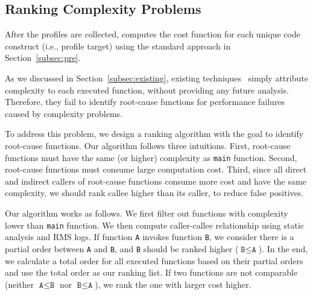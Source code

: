 \subsection{Ranking Complexity Problems}

After the profiles are collected, \Tool computes
the cost function for each unique code construct
(i.e., profile target) using the standard approach
in Section~\ref{subsec:pre}. 
 
As we discussed in Section~\ref{subsec:existing}, 
existing techniques~\cite{Aprof1,Aprof2,AlgoProf} 
simply attribute complexity to each executed function, 
without providing any future analysis. 
Therefore, they fail to identify root-cause functions for 
performance failures caused by complexity problems. 

To address this problem, we design a ranking algorithm 
with the goal to identify root-cause functions. 
Our algorithm follows three intuitions. 
First, root-cause functions must have the same (or higher) 
complexity as \texttt{main} function.
Second, root-cause functions must consume large computation cost.
Third, since all direct and indirect callers of root-cause functions 
consume more cost and have the same complexity, 
we should rank callee higher than its caller, 
to reduce false positives. 

Our algorithm works as follows. 
We first filter out functions with complexity lower than \texttt{main} function.
We then compute caller-callee relationship using static analysis and RMS logs. 
If function \texttt{A} invokes function \texttt{B}, 
we consider there is a partial order between \texttt{A} and \texttt{B},
and \texttt{B} should be ranked higher ($\texttt{B} \leq \texttt{A}$). 
In the end, we calculate a total order for all executed functions based 
on their partial orders and use the total order as our ranking list. 
If two functions are not comparable 
(neither $\texttt{A} \leq \texttt{B}$ nor $\texttt{B} \leq \texttt{A}$), 
we rank the one with larger cost higher. 

